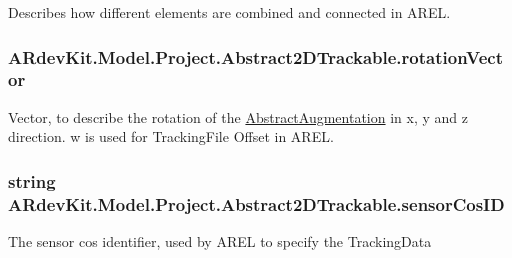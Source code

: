 Describes how different elements are combined and connected in A\-R\-E\-L. 

\hypertarget{class_a_rdev_kit_1_1_model_1_1_project_1_1_abstract2_d_trackable_a85997ab052b01f3680d47d199b4551a0}{
\subsubsection[{rotation\-Vector}]{ A\-Rdev\-Kit.\-Model.\-Project.\-Abstract2\-D\-Trackable.\-rotation\-Vector\hspace{0.3cm}{\ttfamily [protected]}}}\label{class_a_rdev_kit_1_1_model_1_1_project_1_1_abstract2_d_trackable_a85997ab052b01f3680d47d199b4551a0}


Vector, to describe the rotation of the \hyperlink{class_a_rdev_kit_1_1_model_1_1_project_1_1_abstract_augmentation}{Abstract\-Augmentation} in x, y and z direction. w is used for Tracking\-File Offset in A\-R\-E\-L. 

\hypertarget{class_a_rdev_kit_1_1_model_1_1_project_1_1_abstract2_d_trackable_ac965f78edc7135b60377d14acbe6d358}{
\subsubsection[{sensor\-Cos\-I\-D}]{\setlength{\rightskip}{0pt plus 5cm}string A\-Rdev\-Kit.\-Model.\-Project.\-Abstract2\-D\-Trackable.\-sensor\-Cos\-I\-D\hspace{0.3cm}{\ttfamily [protected]}}}\label{class_a_rdev_kit_1_1_model_1_1_project_1_1_abstract2_d_trackable_ac965f78edc7135b60377d14acbe6d358}


The sensor cos identifier, used by A\-R\-E\-L to specify the Tracking\-Data 

